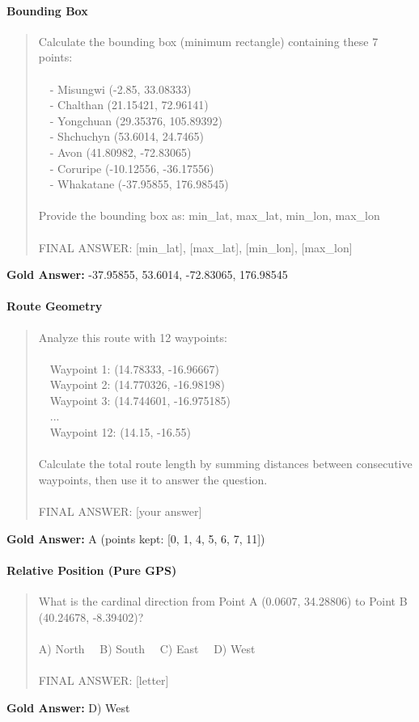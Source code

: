 \paragraph{Bounding Box}
\begin{quote}\ttfamily\small
Calculate the bounding box (minimum rectangle) containing these 7 points:\\
\\
~~- Misungwi (-2.85, 33.08333)\\
~~- Chalthan (21.15421, 72.96141)\\
~~- Yongchuan (29.35376, 105.89392)\\
~~- Shchuchyn (53.6014, 24.7465)\\
~~- Avon (41.80982, -72.83065)\\
~~- Coruripe (-10.12556, -36.17556)\\
~~- Whakatane (-37.95855, 176.98545)\\
\\
Provide the bounding box as: min\_lat, max\_lat, min\_lon, max\_lon\\
\\
FINAL ANSWER: [min\_lat], [max\_lat], [min\_lon], [max\_lon]
\end{quote}
\textbf{Gold Answer:} -37.95855, 53.6014, -72.83065, 176.98545

\paragraph{Route Geometry}
\begin{quote}\ttfamily\small
Analyze this route with 12 waypoints:\\
\\
~~Waypoint 1: (14.78333, -16.96667)\\
~~Waypoint 2: (14.770326, -16.98198)\\
~~Waypoint 3: (14.744601, -16.975185)\\
~~...\\
~~Waypoint 12: (14.15, -16.55)\\
\\
Calculate the total route length by summing distances between consecutive waypoints, then use it to answer the question.\\
\\
FINAL ANSWER: [your answer]
\end{quote}
\textbf{Gold Answer:} A (points kept: [0, 1, 4, 5, 6, 7, 11])

\paragraph{Relative Position (Pure GPS)}
\begin{quote}\ttfamily\small
What is the cardinal direction from Point A (0.0607, 34.28806) to Point B (40.24678, -8.39402)?\\
\\
A) North ~~B) South ~~C) East ~~D) West\\
\\
FINAL ANSWER: [letter]
\end{quote}
\textbf{Gold Answer:} D) West

